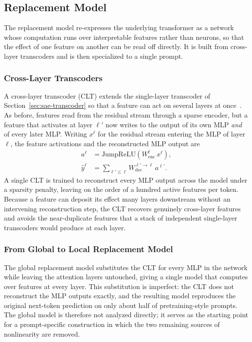 \documentclass[../main.tex]{subfiles}
\begin{document}
\subsection{Replacement Model}
The replacement model re-expresses the underlying transformer as a network whose computation runs over interpretable features rather than neurons, so that the effect of one feature on another can be read off directly. It is built from cross-layer transcoders and is then specialized to a single prompt.

\subsubsection{Cross-Layer Transcoders}
A cross-layer transcoder (CLT) extends the single-layer transcoder of Section~\ref{sec:sae-transcoder} so that a feature can act on several layers at once~\cite{ameisen2025circuit}. As before, features read from the residual stream through a sparse encoder, but a feature that activates at layer $\ell'$ now writes to the output of its own MLP \emph{and} of every later MLP. Writing $x^\ell$ for the residual stream entering the MLP of layer $\ell$, the feature activations and the reconstructed MLP output are
\begin{align}
a^\ell &= \mathrm{JumpReLU}\!\left(W_{\mathrm{enc}}^\ell\, x^\ell\right), \label{eq:clt-enc}\\
\hat{y}^\ell &= \sum_{\ell' \le \ell} W_{\mathrm{dec}}^{\ell' \to \ell}\, a^{\ell'}. \label{eq:clt-dec}
\end{align}
A single CLT is trained to reconstruct every MLP output across the model under a sparsity penalty, leaving on the order of a hundred active features per token. Because a feature can deposit its effect many layers downstream without an intervening reconstruction step, the CLT recovers genuinely cross-layer features and avoids the near-duplicate features that a stack of independent single-layer transcoders would produce at each layer.

\subsubsection{From Global to Local Replacement Model}
The global replacement model substitutes the CLT for every MLP in the network while leaving the attention layers untouched, giving a single model that computes over features at every layer. This substitution is imperfect: the CLT does not reconstruct the MLP outputs exactly, and the resulting model reproduces the original next-token prediction on only about half of pretraining-style prompts. The global model is therefore not analyzed directly; it serves as the starting point for a prompt-specific construction in which the two remaining sources of nonlinearity are removed.
\end{document}
